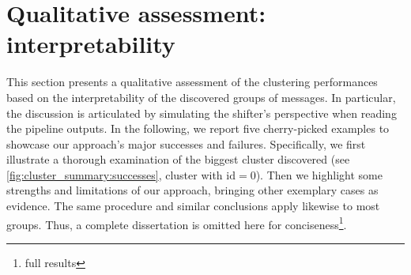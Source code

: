 \section{Qualitative assessment: interpretability}
\label{sec:opint:qualitative}
This section presents a qualitative assessment of the clustering performances based on the interpretability of the discovered groups of messages.
In particular, the discussion is articulated by simulating the shifter's perspective when reading the pipeline outputs.
In the following, we report five cherry-picked examples to showcase our approach's major successes and failures.
Specifically, we first illustrate a thorough examination of the biggest cluster discovered (see \cref{fig:cluster_summary:successes}, cluster with $\text{id}=0$).
Then we highlight some strengths and limitations of our approach, bringing other exemplary cases as evidence.
The same procedure and similar conclusions apply likewise to most groups. Thus, a complete dissertation is omitted here for conciseness\footnote{full results \opintresults}.



